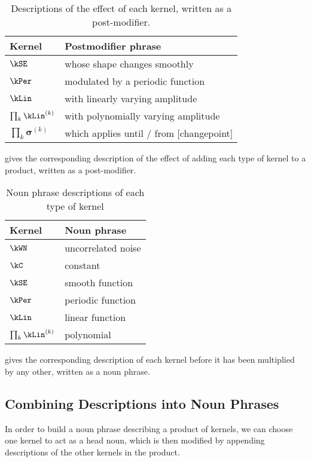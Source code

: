 \begin{table}[h!]
\centering
\begin{tabular}{l|l}
Kernel & Postmodifier phrase \\
\midrule
$\kSE$  & whose shape changes smoothly \\
$\kPer$ & modulated by a periodic function \\
$\kLin$ & with linearly varying amplitude \\
$\prod_k \kLin^{(k)}$ & with polynomially varying amplitude \\
$\prod_k \boldsymbol{\sigma}^{(k)}$ & which applies until / from [changepoint] \\
\end{tabular}
\caption[Descriptions of the effect of each kernel, written as a post-modifier]{
Descriptions of the effect of each kernel, written as a post-modifier.
}
\label{table:modifiers}
\end{table}

 gives the corresponding description of the effect of adding each type of kernel to a product, written as a post-modifier.
%
\begin{table}[h!]
\centering
\begin{tabular}{l|l}
Kernel & Noun phrase \\
\midrule
$\kWN$  & uncorrelated noise \\
$\kC$   & constant \\
$\kSE$  & smooth function \\
$\kPer$ & periodic function \\
$\kLin$ & linear function \\
$\prod_k \kLin^{(k)}$ & polynomial \\
\end{tabular}
\caption[Noun phrase descriptions of each type of kernel]{
Noun phrase descriptions of each type of kernel
}
\label{table:nouns}
\end{table}
%
 gives the corresponding description of each kernel before it has been multiplied by any other, written as a noun phrase.

\subsection{Combining Descriptions into Noun Phrases}

In order to build a noun phrase describing a product of kernels, we can choose one kernel to act as a head noun, which is then modified by appending descriptions of the other kernels in the product.

